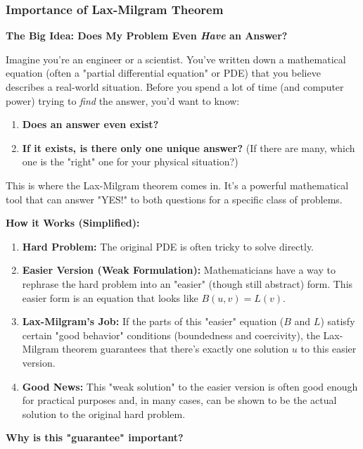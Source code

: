 \subsubsection{Importance of Lax-Milgram Theorem}

\textbf{The Big Idea: Does My Problem Even \textit{Have} an Answer?}

Imagine you're an engineer or a scientist. You've written down a mathematical equation (often a "partial differential equation" or PDE) that you believe describes a real-world situation. Before you spend a lot of time (and computer power) trying to \textit{find} the answer, you'd want to know:

\begin{enumerate}
	\item \textbf{Does an answer even exist?}
	\item \textbf{If it exists, is there only one unique answer?} (If there are many, which one is the "right" one for your physical situation?)
\end{enumerate}

This is where the Lax-Milgram theorem comes in. It's a powerful mathematical tool that can answer "YES!" to both questions for a specific class of problems.

\textbf{How it Works (Simplified):}

\begin{enumerate}
	\item \textbf{Hard Problem:} The original PDE is often tricky to solve directly.
	\item \textbf{Easier Version (Weak Formulation):} Mathematicians have a way to rephrase the hard problem into an "easier" (though still abstract) form. This easier form is an equation that looks like $B(u,v)=L(v)$.
	\item \textbf{Lax-Milgram's Job:} If the parts of this "easier" equation ($B$ and $L$) satisfy certain "good behavior" conditions (boundedness and coercivity), the Lax-Milgram theorem guarantees that there's exactly one solution $u$ to this easier version.
	\item \textbf{Good News:} This "weak solution" to the easier version is often good enough for practical purposes and, in many cases, can be shown to be the actual solution to the original hard problem.
\end{enumerate}

\textbf{Why is this "guarantee" important?}

